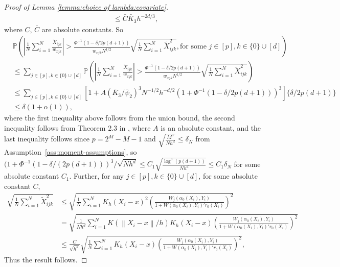 \documentclass[11pt]{article}
\newcommand{\norm}[1]{\left\lVert #1 \right\rVert}
\begin{document}
\begin{proof}[Proof of Lemma \ref{lemma:choice of lambda:covariate}]
$$\begin{array}{rl}
&\displaystyle\leq\bar{C}\bar{K}_3h^{-2d/3},
\end{array}$$
where $\underline{C}$, $\bar{C}$ are absolute constants. So 
$$\begin{array}{rl}
&\displaystyle\mathbb{P} \left(\left| \frac{1}{N}\sum_{i=1}^N \frac{\tilde X_{ijk}}{w_{xjk}} \right| > \frac{\Phi^{-1}(1-\delta/2p(d+1))}{w_{xjk} N^{1/2}} \sqrt{\frac{1}{N}\sum_{i=1}^N \tilde X_{ijk}^2}, \mbox{for some } j\in [p], k\in\{0\}\cup[d] \right)  \\
&\displaystyle \leq  \sum_{j\in [p],k\in\{0\}\cup[d]} \mathbb{P} \left( \left|\frac{1}{N}\sum_{i=1}^N\frac{\tilde X_{ijk}}{w_{xjk}} \right| > \frac{\Phi^{-1}(1-\delta/2p(d+1))}{w_{xjk}N^{1/2}} \sqrt{\frac{1}{N}\sum_{i=1}^N \tilde X_{ijk}^2 } \right)\\
&\displaystyle\leq\sum_{j\in [p],k\in\{0\}\cup[d]}\!\!\!\!\!\!\!\!\!\!\!\!\left[1+A(\bar{K}_3/\bar{\psi}_2)^3N^{-1/2}h^{-d/2}(1+\Phi^{-1}(1-\delta/2p(d+1)))^{3}\right]\{\delta/2p(d+1)\}\\
&\displaystyle\leq \delta \left(1+\mathrm{o}(1)\right),
\end{array}$$
where the first inequality above follows from the union bound, the second inequality follows from Theorem 2.3 in \citet{jing2003self}, where $A$ is an absolute constant, and the last inequality follows since $p=2^M-M-1$ and $\sqrt{\frac{M^3}{Nh^d}}\leq\delta_N$ from Assumption~\ref{ass:moment-assumptions}, so $(1+\Phi^{-1}(1-\delta/(2p(d+1)))^3/\sqrt{Nh^d}\leq C_1\sqrt{\frac{\log^3(p(d+1))}{Nh^d}}\leq C_1\delta_N$ for some absolute constant $C_1$.
Further, for any $j\in[p],k\in\{0\}\cup[d]$, for some absolute constant $C$,
$$\begin{array}{rl}
\displaystyle\sqrt{\frac{1}{N}\sum_{i=1}^N \tilde X_{ijk}^2}&\displaystyle\leq\sqrt{\frac{1}{N}\sum_{i=1}^NK_h(X_i-x)^2\left(\frac{W_j(\alpha_0(X_i),Y_i)}{1+W(\alpha_0(X_i),Y_i)'r_0(X_i)}\right)^2}\\
&\displaystyle=\sqrt{\frac{1}{Nh^{d}}\sum_{i=1}^NK(\norm{X_i-x}/h)K_h(X_i-x)\left(\frac{W_j(\alpha_0(X_i),Y_i)}{1+W(\alpha_0(X_i),Y_i)'r_0(X_i)}\right)^2}\\
&\displaystyle\leq \frac{C}{\sqrt{h^d}}\sqrt{\frac{1}{N}\sum_{i=1}^NK_h(X_i-x)\left(\frac{W_j(\alpha_0(X_i),Y_i)}{1+W(\alpha_0(X_i),Y_i)'r_0(X_i)}\right)^2},
\end{array}$$
Thus the result follows. 
\end{proof}
\end{document}
